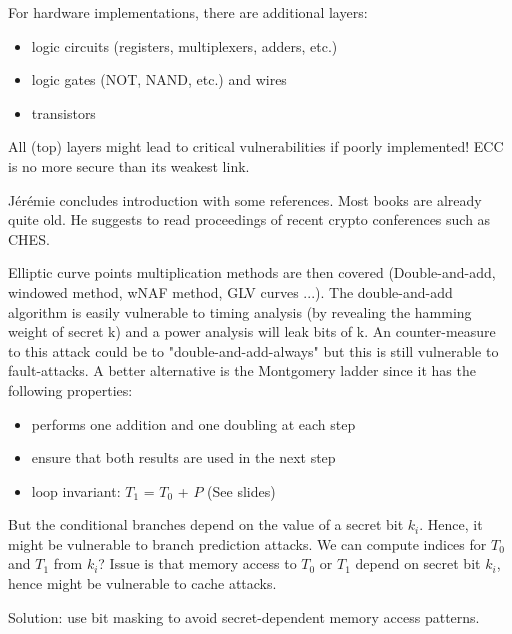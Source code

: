 \documentclass[11pt]{article}
\begin{document}
For hardware implementations, there are additional layers:
\begin{itemize}
	\item logic circuits (registers, multiplexers, adders, etc.)
	\item logic gates (NOT, NAND, etc.) and wires
	\item transistors
\end{itemize}

All (top) layers might lead to critical vulnerabilities if poorly implemented! ECC is no more secure than its weakest link.

Jérémie concludes introduction with some references. Most books are already quite old. He suggests to read proceedings of recent crypto conferences such as CHES.

Elliptic curve points multiplication methods are then covered (Double-and-add, windowed method, wNAF method, GLV curves ...). The double-and-add algorithm is easily vulnerable to timing analysis (by revealing the hamming weight of secret k) and a power analysis will leak bits of k. An counter-measure to this attack could be to "double-and-add-always" but this is still vulnerable to fault-attacks. A better alternative is the Montgomery ladder since it has the following properties: 
\begin{itemize}
	\item performs one addition and one doubling at each step
	\item ensure that both results are used in the next step
	\item loop invariant: $T_1$ = $T_0$ + $P$ (See slides)
\end{itemize}

But the conditional branches depend on the value of a secret bit $k_i$. Hence, it might be vulnerable to branch prediction attacks. We can compute indices for $T_0$ and $T_1$ from $k_i$? Issue is that memory access to $T_0$ or $T_1$ depend on secret bit $k_i$, hence might be vulnerable to cache attacks.

Solution: use bit masking to avoid secret-dependent memory access patterns.
\end{document}
